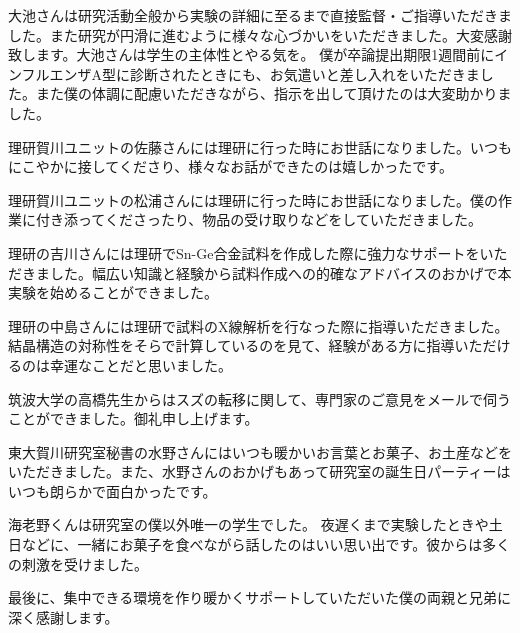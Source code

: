 大池さんは研究活動全般から実験の詳細に至るまで直接監督・ご指導いただきました。また研究が円滑に進むように様々な心づかいをいただきました。大変感謝致します。大池さんは学生の主体性とやる気を。
僕が卒論提出期限1週間前にインフルエンザA型に診断されたときにも、お気遣いと差し入れをいただきました。また僕の体調に配慮いただきながら、指示を出して頂けたのは大変助かりました。

理研賀川ユニットの佐藤さんには理研に行った時にお世話になりました。いつもにこやかに接してくださり、様々なお話ができたのは嬉しかったです。

理研賀川ユニットの松浦さんには理研に行った時にお世話になりました。僕の作業に付き添ってくださったり、物品の受け取りなどをしていただきました。

理研の吉川さんには理研でSn-Ge合金試料を作成した際に強力なサポートをいただきました。幅広い知識と経験から試料作成への的確なアドバイスのおかげで本実験を始めることができました。

理研の中島さんには理研で試料のX線解析を行なった際に指導いただきました。結晶構造の対称性をそらで計算しているのを見て、経験がある方に指導いただけるのは幸運なことだと思いました。

筑波大学の高橋先生からはスズの転移に関して、専門家のご意見をメールで伺うことができました。御礼申し上げます。

東大賀川研究室秘書の水野さんにはいつも暖かいお言葉とお菓子、お土産などをいただきました。また、水野さんのおかげもあって研究室の誕生日パーティーはいつも朗らかで面白かったです。

海老野くんは研究室の僕以外唯一の学生でした。
夜遅くまで実験したときや土日などに、一緒にお菓子を食べながら話したのはいい思い出です。彼からは多くの刺激を受けました。

最後に、集中できる環境を作り暖かくサポートしていただいた僕の両親と兄弟に深く感謝します。

\newpage